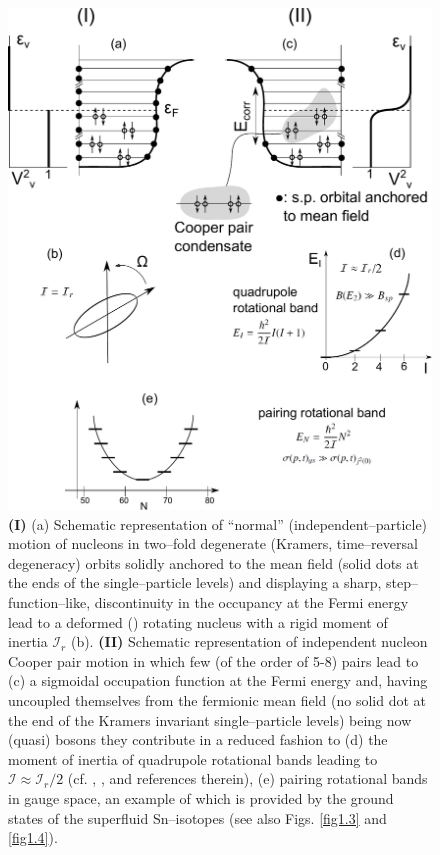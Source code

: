  
\begin{figure}
\centerline{\includegraphics*[width=\textwidth,angle=0]{nutshell/figs/fig1A3.pdf}}
\caption{\textbf{(I)} (a) Schematic representation of ``normal'' (independent--particle) motion of nucleons in  two--fold degenerate (Kramers, time--reversal degeneracy) orbits solidly anchored to the mean field (solid dots at the ends of the single--particle levels) and  displaying a sharp, step--function--like, discontinuity in the occupancy at the Fermi energy  lead to a deformed  (\cite{Nilsson:55}) rotating nucleus with a rigid moment of inertia $\mathcal{I}_r$ (b). \textbf{(II)} Schematic representation of independent nucleon Cooper pair  motion in which few (of the order of 5-8) pairs lead to (c) a sigmoidal occupation function at the Fermi energy and, having uncoupled themselves from the fermionic mean field (no solid dot at the end of the Kramers invariant single--particle levels) being now (quasi) bosons they   contribute in a reduced fashion to (d) the moment of inertia of quadrupole rotational bands leading to $\mathcal{I}\approx\mathcal{I}_r/2$ (cf. \cite{Belyaev:13}, \cite{Belyaev:59}, \cite{Bohr:75} and references therein), (e) pairing rotational bands in gauge space, an example of which is  provided by the ground states of the superfluid Sn--isotopes (see also Figs. \ref{fig1.3} and \ref{fig1.4}).}\label{fig1A3}
\end{figure}
